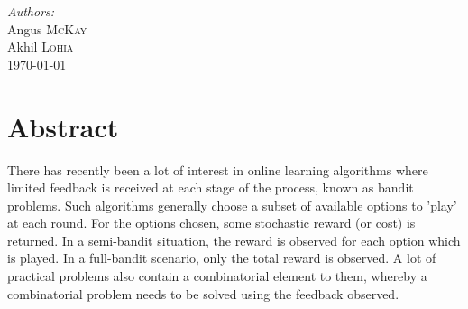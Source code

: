 \begin{titlepage}
\Large \emph{Authors:}\\
Angus \textsc{McKay}\\ %
Akhil \textsc{Lohia}\\[3cm] %


{\large \today}\\[3cm] %


 

\vfill %

\end{titlepage}


\section{Abstract}


There has recently been a lot of interest in online learning algorithms where limited feedback is received at each stage of the process, known as bandit problems. Such algorithms generally choose a subset of available options to 'play' at each round. For the options chosen, some stochastic reward (or cost) is returned. In a semi-bandit situation, the reward is observed for each option which is played. In a full-bandit scenario, only the total reward is observed. A lot of practical problems also contain a combinatorial element to them, whereby a combinatorial problem needs to be solved using the feedback observed.\\


